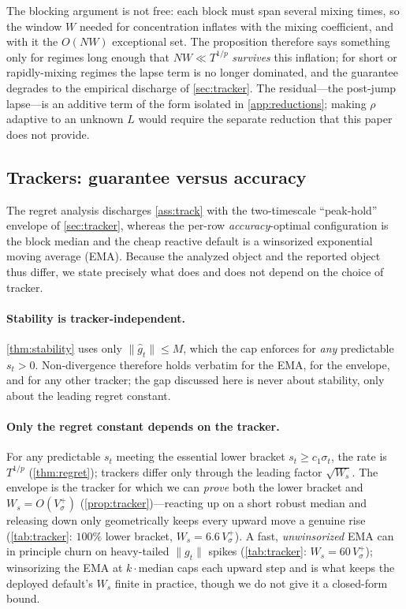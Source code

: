 \documentclass{article}
\newcommand{\norm}[1]{\lVert #1 \rVert}
\newcommand{\gt}{g_t}
\begin{document}
The blocking argument is not free: each block must span several mixing times, so the window
$W$ needed for concentration inflates with the mixing coefficient, and with it the $O(NW)$
exceptional set. The proposition therefore says something only for regimes long enough that
$NW\ll T^{1/p}$ \emph{survives} this inflation; for short or rapidly-mixing regimes the lapse
term is no longer dominated, and the guarantee degrades to the empirical discharge of
\cref{sec:tracker}. The residual---the post-jump lapse---is an additive term of the form
isolated in \cref{app:reductions}; making $\rho$ adaptive to an unknown $L$ would require the
separate reduction that this paper does not provide.

\subsection{Trackers: guarantee versus accuracy}
\label{app:tracker}

The regret analysis discharges \cref{ass:track} with the two-timescale ``peak-hold''
envelope of \cref{sec:tracker}, whereas the per-row \emph{accuracy}-optimal configuration is
the block median and the cheap reactive default is a winsorized exponential moving average
(EMA). Because the analyzed object and the reported object thus differ, we state precisely
what does and does not depend on the choice of tracker.

\paragraph{Stability is tracker-independent.} \cref{thm:stability} uses only
$\norm{\hat g_t}\le M$, which the cap enforces for \emph{any} predictable $s_t>0$.
Non-divergence therefore holds verbatim for the EMA, for the envelope, and for any
other tracker; the gap discussed here is never about stability, only about the leading
regret constant.

\paragraph{Only the regret constant depends on the tracker.} For any predictable $s_t$
meeting the essential lower bracket $s_t\ge c_1\sigma_t$, the rate is $T^{1/p}$
(\cref{thm:regret}); trackers differ only through the leading factor $\sqrt{W_s}$. The
envelope is the tracker for which we can \emph{prove} both the lower bracket and
$W_s=O(V_\sigma^+)$ (\cref{prop:tracker})---reacting up
on a short robust median and releasing down only geometrically keeps every upward move a
genuine rise (\cref{tab:tracker}: $100\%$ lower bracket, $W_s=6.6\,V_\sigma^+$). A fast,
\emph{unwinsorized} EMA can in principle churn on heavy-tailed $\norm{\gt}$ spikes
(\cref{tab:tracker}: $W_s=60\,V_\sigma^+$); winsorizing the EMA at $k\cdot\mathrm{median}$
caps each upward step and is what keeps the deployed default's $W_s$ finite in practice,
though we do not give it a closed-form bound.
\end{document}
